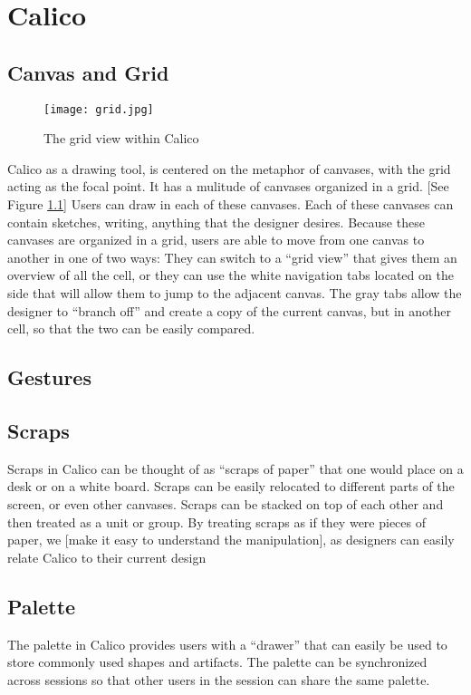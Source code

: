 \chapter{Calico}


\section{Canvas and Grid}

\begin{figure}[htb]
\centering
\texttt{[image: grid.jpg]}
\caption{The grid view within Calico}
\label{fig:grid}
\end{figure}

Calico as a drawing tool, is centered on the metaphor of canvases, with the grid acting as the focal point.
It has a mulitude of canvases organized in a grid. [See Figure \ref{fig:grid}]
Users can draw in each of these canvases.
Each of these canvases can contain sketches, writing, anything that the designer desires.
Because these canvases are organized in a grid, users are able to move from one canvas to another in one of two ways: They can switch to a ``grid view'' that gives them an overview of all the cell, or they can use the white navigation tabs located on the side that will allow them to jump to the adjacent canvas.
The gray tabs allow the designer to ``branch off'' and create a copy of the current canvas, but in another cell, so that the two can be easily compared.

\section{Gestures}

\section{Scraps}
Scraps in Calico can be thought of as ``scraps of paper'' that one would place on a desk or on a white board.
Scraps can be easily relocated to different parts of the screen, or even other canvases.
Scraps can be stacked on top of each other and then treated as a unit or group.
By treating scraps as if they were pieces of paper, we [make it easy to understand the manipulation], as designers can easily relate Calico to their current design 

\section{Palette}
The palette in Calico provides users with a ``drawer'' that can easily be used to store commonly used shapes and artifacts.
The palette can be synchronized across sessions so that other users in the session can share the same palette.